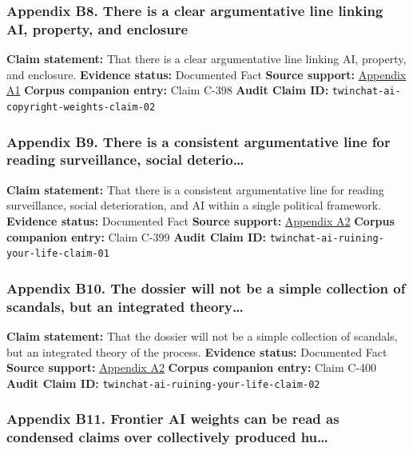 \documentclass[
  american,
  11pt,
  letterpaper,
]{article}
\begin{document}
\subsubsection{Appendix B8. There is a clear argumentative line linking
AI, property, and
enclosure}\label{appendix-b8-there-is-a-clear-argumentative-line-linking-ai-property-and-enclosure}

\textbf{Claim statement:} That there is a clear argumentative line
linking AI, property, and enclosure. \textbf{Evidence status:}
Documented Fact \textbf{Source support:}
\hyperref[appendix-a1-ai-copyright-weights-a-new-frontier-in-intellectual-property-law]{Appendix
A1} \textbf{Corpus companion entry:} Claim C-398 \textbf{Audit Claim
ID:} \texttt{twinchat-ai-copyright-weights-claim-02}

\subsubsection{Appendix B9. There is a consistent argumentative line for
reading surveillance, social
deterio\ldots{}}\label{appendix-b9-there-is-a-consistent-argumentative-line-for-reading-surveillance-social-deterio}

\textbf{Claim statement:} That there is a consistent argumentative line
for reading surveillance, social deterioration, and AI within a single
political framework. \textbf{Evidence status:} Documented Fact
\textbf{Source support:}
\hyperref[appendix-a2-how-ai-is-ruining-your-life-to-build-an-empire]{Appendix
A2} \textbf{Corpus companion entry:} Claim C-399 \textbf{Audit Claim
ID:} \texttt{twinchat-ai-ruining-your-life-claim-01}

\subsubsection{Appendix B10. The dossier will not be a simple collection
of scandals, but an integrated
theory\ldots{}}\label{appendix-b10-the-dossier-will-not-be-a-simple-collection-of-scandals-but-an-integrated-theory}

\textbf{Claim statement:} That the dossier will not be a simple
collection of scandals, but an integrated theory of the process.
\textbf{Evidence status:} Documented Fact \textbf{Source support:}
\hyperref[appendix-a2-how-ai-is-ruining-your-life-to-build-an-empire]{Appendix
A2} \textbf{Corpus companion entry:} Claim C-400 \textbf{Audit Claim
ID:} \texttt{twinchat-ai-ruining-your-life-claim-02}

\subsubsection{Appendix B11. Frontier AI weights can be read as
condensed claims over collectively produced
hu\ldots{}}\label{appendix-b11-frontier-ai-weights-can-be-read-as-condensed-claims-over-collectively-produced-hu}
\end{document}
